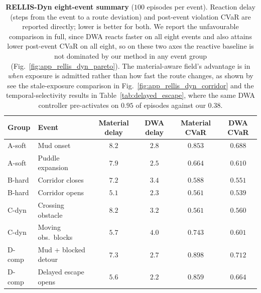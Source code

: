 \begin{table}[htbp]
\centering
\caption{\textbf{RELLIS-Dyn eight-event summary} ($100$ episodes per event).
Reaction delay (steps from the event to a route deviation) and post-event
violation CVaR are reported directly; lower is better for both. We report the
unfavourable comparison in full, since DWA reacts faster on all eight events and also
attains lower post-event CVaR on all eight, so on these two axes the reactive
baseline is not dominated by our method in any event group
(Fig.~\ref{fig:app_rellis_dyn_pareto}). The material-aware field's advantage is
in \emph{when} exposure is admitted rather than how fast the route changes, as shown by
see the stale-exposure comparison in Fig.~\ref{fig:app_rellis_dyn_corridor} and
the temporal-selectivity results in Table~\ref{tab:delayed_escape}, where the
same DWA controller pre-activates on $0.95$ of episodes against our $0.38$.}
\label{tab:app_rellis_dyn_8event_groups}
\small
\setlength{\tabcolsep}{5pt}
\renewcommand{\arraystretch}{1.08}
\begin{tabular}{llcccc}
\toprule
Group & Event
  & Material delay & DWA delay
  & Material CVaR & DWA CVaR \\
\midrule
A-soft & Mud onset              & $8.2$ & $2.8$ & $0.853$ & $0.688$ \\
A-soft & Puddle expansion       & $7.9$ & $2.5$ & $0.664$ & $0.610$ \\
B-hard & Corridor closes        & $7.2$ & $3.4$ & $0.588$ & $0.551$ \\
B-hard & Corridor opens         & $5.1$ & $2.3$ & $0.561$ & $0.539$ \\
C-dyn  & Crossing obstacle      & $8.2$ & $3.2$ & $0.561$ & $0.560$ \\
C-dyn  & Moving obs.\ blocks    & $5.7$ & $4.0$ & $0.743$ & $0.601$ \\
D-comp & Mud + blocked detour   & $7.3$ & $2.7$ & $0.898$ & $0.712$ \\
D-comp & Delayed escape opens   & $5.6$ & $2.2$ & $0.859$ & $0.664$ \\
\bottomrule
\end{tabular}
\end{table}

